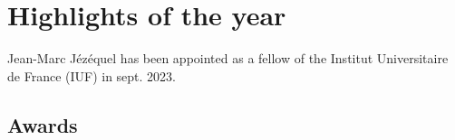 

\section{Highlights of the year}
\label{DIVERSE:highlights}

Jean-Marc Jézéquel has been appointed as a fellow of the Institut Universitaire de France (IUF) in sept. 2023.

\subsection{Awards}
\label{DIVERSE:highlights-awards}
